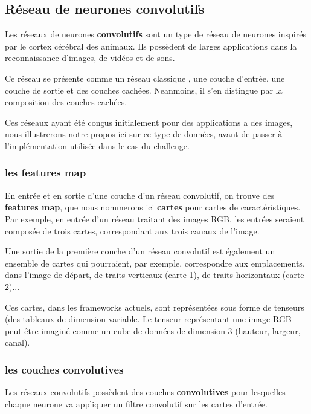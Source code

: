 \hypertarget{Ruxe9seau-de-neurones-convolutif}{%
\subsection{Réseau de neurones convolutifs}
\label{Ruxe9seau-de-neurones-convolutif}}

Les réseaux de neurones \textbf{convolutifs} sont un type de réseau de neurones
inspirés par le cortex cérébral des animaux.
Ils possèdent de larges applications dans la reconnaissance d'images, de vidéos
et de sons.

Ce réseau se présente comme un réseau classique , une couche d'entrée,
une couche de sortie et des couches cachées.
Neanmoins, il s'en distingue par la composition des couches cachées.

Ces réseaux ayant été conçus initialement pour des applications a des images,
nous illustrerons notre propos ici sur ce type de données, avant de passer
à l'implémentation utilisée dans le cas du challenge.

\subsubsection{les features map}

En entrée et en sortie d'une couche d'un réseau convolutif, on trouve des
\textbf{features map}, que nous nommerons ici \textbf{cartes} pour cartes de
caractéristiques.
Par exemple, en entrée d'un réseau traitant des images RGB, les entrées
seraient composée de trois cartes, correspondant aux trois canaux de l'image.

Une sortie de la première couche d'un réseau convolutif est également un
ensemble de cartes qui pourraient, par exemple, correspondre aux emplacements,
dans l'image de départ, de traits verticaux (carte 1), de traits horizontaux
(carte 2)...

Ces cartes, dans les frameworks actuels, sont représentées sous forme de
tenseurs (des tableaux de dimension variable.
Le tenseur représentant une image RGB peut être imaginé comme un cube de données
de dimension 3 (hauteur, largeur, canal).

\subsubsection{les couches convolutives}

Les réseaux convolutifs possèdent des couches \textbf{convolutives}
pour lesquelles chaque neurone va appliquer un filtre convolutif
sur les cartes d'entrée.

